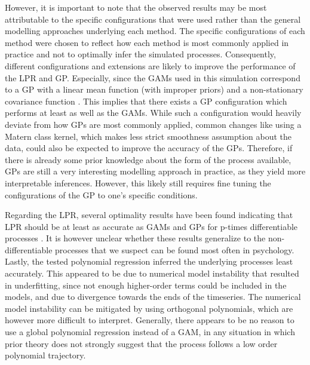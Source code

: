 \documentclass[man, floatsintext]{apa7}
\begin{document}
However, it is important to note that the observed results may be most
attributable to the specific configurations that were used rather than the
general modelling approaches underlying each method. The specific
configurations of each method were chosen to reflect how each method is most
commonly applied in practice and not to optimally infer the simulated
processes. Consequently, different configurations and extensions are likely to
improve the performance of the LPR and GP\@. Especially, since the GAMs used in
this simulation correspond to a GP with a linear mean function (with improper
priors) and a non-stationary covariance function
\parencite{wahba_improper_1978, rasmussen_gaussian_2006}. This implies that
there exists a GP configuration which performs at least as well as the GAMs.
While such a configuration would heavily deviate from how GPs are most commonly
applied, common changes like using a Matern class kernel, which makes less
strict smoothness assumption about the data, could also be expected to improve
the accuracy of the GPs. Therefore, if there is already some prior knowledge
about the form of the process available, GPs are still a very interesting
modelling approach in practice, as they yield more interpretable inferences.
However, this likely still requires fine tuning the configurations of the
GP to one's specific conditions.

Regarding the LPR, several optimality results have been found indicating that
LPR should be at least as accurate as GAMs and GPs for p-times differentiable
processes \parencite{fan_local_1997}. It is however unclear whether these
results generalize to the non-differentiable processes that we suspect can be
found most often in psychology. Lastly, the tested polynomial regression
inferred the underlying processes least accurately. This appeared to be due to
numerical model instability that resulted in underfitting, since not enough
higher-order terms could be included in the models, and due to divergence
towards the ends of the timeseries. The numerical model instability can be
mitigated by using orthogonal polynomials, which are however more difficult to
interpret. Generally, there appears to be no reason to use a global polynomial
regression instead of a GAM, in any situation in which prior theory does not
strongly suggest that the process follows a low order polynomial trajectory.
\end{document}
